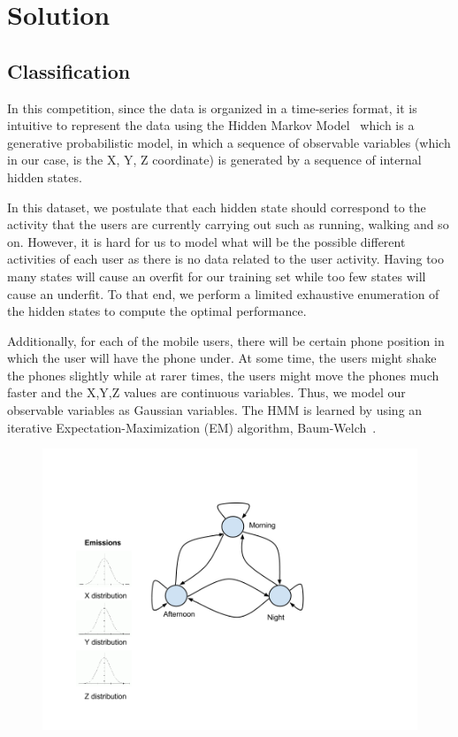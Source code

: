 \section{Solution}

\subsection{Classification}
In this competition, since the data is organized in a time-series format, it is
intuitive to represent the data using the Hidden Markov Model~\cite{HMM1996}
which is a generative probabilistic model, in which a sequence of observable
variables (which in our case, is the X, Y, Z coordinate) is generated by a
sequence of internal hidden states.

In this dataset, we postulate that each hidden state should correspond to the
activity that the users are currently carrying out such as running, walking and
so on. However, it is hard for us to model what will be the possible different
activities of each user as there is no data related to the user activity. 
Having too many states will cause an overfit for our
training set while too few states will cause an underfit. To that end, we
perform a limited exhaustive enumeration of the hidden states to compute the
optimal performance.

Additionally, for each of the mobile users, there will be certain phone
position in which the user will have the phone under. At some time, the users
might shake the phones slightly while at rarer times, the users might move the
phones much faster and the X,Y,Z values are continuous variables.
Thus, we model our observable variables as Gaussian variables. The HMM
is learned by using an iterative Expectation-Maximization (EM) algorithm, 
Baum-Welch~\cite{BaumWelch}.

\begin{figure}[h]
  \includegraphics[width=\linewidth]{./figs/HMM.png}
  \label{fig:points}
\end{figure}

